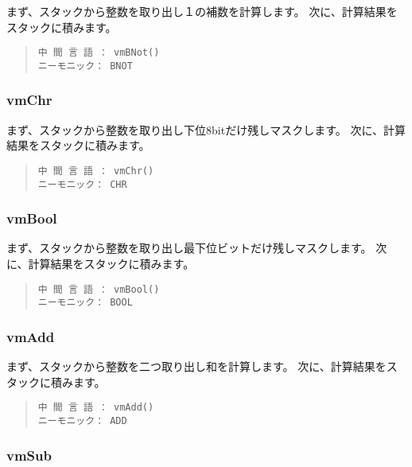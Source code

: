 まず、スタックから整数を取り出し１の補数を計算します。
次に、計算結果をスタックに積みます。

\begin{quote}
\begin{verbatim}
中 間 言 語 ： vmBNot()
ニーモニック： BNOT
\end{verbatim}
\end{quote}

\subsubsection{vmChr}

まず、スタックから整数を取り出し下位8bitだけ残しマスクします。
次に、計算結果をスタックに積みます。

\begin{quote}
\begin{verbatim}
中 間 言 語 ： vmChr()
ニーモニック： CHR
\end{verbatim}
\end{quote}

\subsubsection{vmBool}

まず、スタックから整数を取り出し最下位ビットだけ残しマスクします。
次に、計算結果をスタックに積みます。

\begin{quote}
\begin{verbatim}
中 間 言 語 ： vmBool()
ニーモニック： BOOL
\end{verbatim}
\end{quote}

\subsubsection{vmAdd}

まず、スタックから整数を二つ取り出し和を計算します。
次に、計算結果をスタックに積みます。

\begin{quote}
\begin{verbatim}
中 間 言 語 ： vmAdd()
ニーモニック： ADD
\end{verbatim}
\end{quote}

\subsubsection{vmSub}

